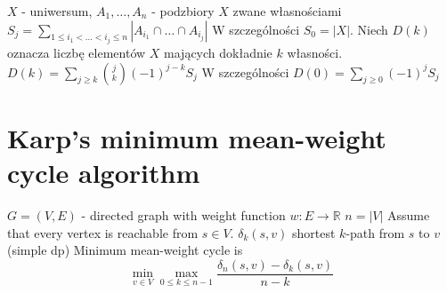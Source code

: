 $X$ - uniwersum, $A_1, \dots, A_n$ - podzbiory $X$ zwane własnościami
$S_j = \sum_{1\le i_1 < \dots < i_j \le n} | A_{i_1} \cap \dots \cap A_{i_j}|$
W szczególności $S_0 = |X|$. Niech $D(k)$ oznacza liczbę elementów $X$ mających dokładnie $k$ własności.
$D(k) = \sum_{j\ge k}\binom{j}{k} \left(-1\right)^{j-k}S_j$
W szczególności $D(0) = \sum_{j \ge 0} \left(-1\right)^j S_j$

\section{Karp’s minimum mean-weight cycle algorithm}
$G = (V, E)$ - directed graph with weight function $w : E \to \mathbb{R}$
$n = |V|$
Assume that every vertex is reachable from $s \in V$.
$\delta_k(s, v)$ shortest $k$-path from $s$ to $v$ (simple dp)
Minimum mean-weight cycle is
$$ \min_{v\in V} \max_{0 \leq k \leq n-1} \frac{\delta_n(s, v) - \delta_k(s, v)}{n - k} $$
